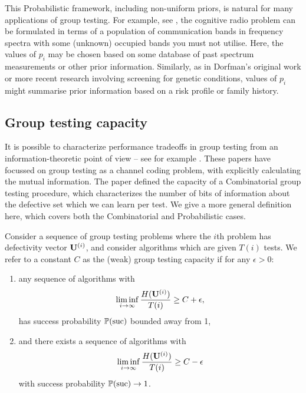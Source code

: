 This Probabilistic framework, including non-uniform priors, is natural for many applications of group testing.
For example, see \cite{atia2}, the cognitive radio problem can be formulated in terms of  a population
 of communication bands in frequency spectra with some (unknown) occupied bands you must not utilise. Here, the values of $p_i$ may be chosen
 based on some database of past spectrum measurements or other prior information. Similarly, as in Dorfman's original work  \cite{dorfman} or more recent 
research \cite{shental} involving screening for genetic conditions, values of
$p_i$ might summarise prior information based on a risk profile or  family history.
%
\subsection{Group testing capacity}
%
It is possible to characterize performance tradeoffs in group testing 
 from an information-theoretic point of view -- see for example \cite{atia, johnsonc10, johnson33, tan}. These papers have focussed on group testing as a channel coding problem, 
with \cite{atia, tan}
explicitly calculating the mutual information.
The paper \cite{johnsonc10} defined the capacity of a Combinatorial group testing procedure, which characterizes the number of bits of information
about the defective set which we can learn per test. We give a more general definition here,
which covers both the Combinatorial and Probabilistic cases.
%
\begin{definition} \label{def:capacity} Consider a sequence of group testing problems where the $i$th problem
has defectivity vector  ${\mathbf{ U}}^{(i)}$, and consider algorithms which are given $T(i)$ tests.
We refer to a constant $C$ as the (weak) group testing capacity if for any $\epsilon > 0$:
  \begin{enumerate}
    \item any sequence of algorithms with
      \begin{equation} \label{eq:lower}
        \liminf_{i \rightarrow \infty} \frac{ H({\mathbf{ U}}^{(i)}) }{T(i)} \geq C+ \epsilon,
      \end{equation}
      has success probability ${\mathbb{P}}({\rm suc})$ bounded away from 1,
    \item and there exists a sequence of algorithms with
      \begin{equation} \label{eq:upper}
        \liminf_{i \rightarrow \infty} \frac{H({\mathbf{ U}}^{(i)}) }{T(i)}  \geq C - \epsilon
      \end{equation}
      with success probability ${\mathbb{P}}({\rm suc}) \rightarrow 1$.
  \end{enumerate}
\end{definition}
